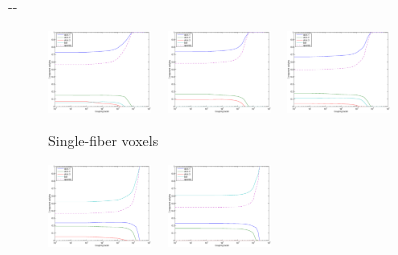 \documentclass{article}
\begin{document}
\begin{figure}[H]
  \begin{adjustwidth}{-\oddsidemargin}{-\rightmargin}
    \centering
    \begin{subfigure}{0.8\paperwidth}
      \centering
      \includegraphics[width=0.3\textwidth]{figures/sparsity_50_43_single.eps} ~
      \includegraphics[width=0.3\textwidth]{figures/sparsity_51_43_single.eps} ~
      \includegraphics[width=0.3\textwidth]{figures/sparsity_52_43_single.eps}
      \caption{Single-fiber voxels}
    \end{subfigure}
    \begin{subfigure}{0.8\paperwidth}
      \centering
      \includegraphics[width=0.3\textwidth]{figures/sparsity_60_47_cross.eps} ~
      \includegraphics[width=0.3\textwidth]{figures/sparsity_60_48_cross.eps} ~

\end{subfigure}
\end{adjustwidth}
\end{figure}
\end{document}
